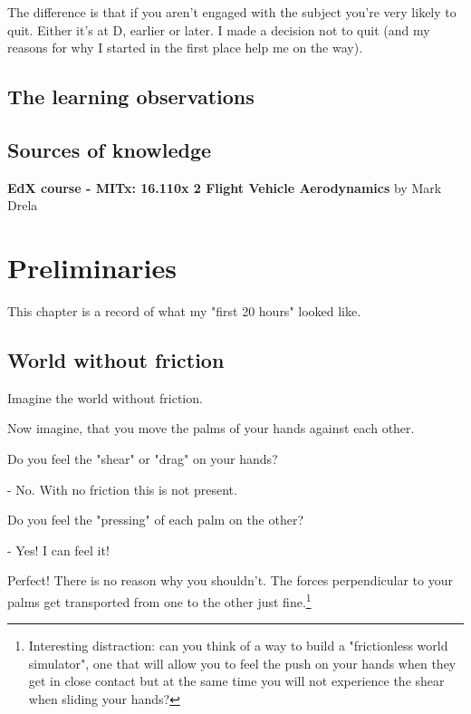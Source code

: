\documentclass[12pt]{report}
\begin{document}
The difference is that if you aren't engaged with the subject you're very likely to quit. Either it's at D, earlier or later. I made a decision not to quit (and my reasons for why I started in the first place help me on the way). 


\section{The learning observations} \label{chap:learning_observations}




\section{Sources of knowledge}


\textbf{EdX course - MITx: 16.110x 2 Flight Vehicle Aerodynamics} by Mark Drela










\chapter{Preliminaries}

This chapter is a record of what my "first 20 hours" looked like.


\section{World without friction} \label{chap:without_friction}

Imagine the world without friction.

Now imagine, that you move the palms of your hands against each other.

Do you feel the "shear" or "drag" on your hands?

- No. With no friction this is not present.

Do you feel the "pressing" of each palm on the other?

- Yes! I can feel it!

Perfect! There is no reason why you shouldn't. The forces perpendicular to your palms get transported from one to the other just fine.\footnote{Interesting distraction: can you think of a way to build a "frictionless world simulator", one that will allow you to feel the push on your hands when they get in close contact but at the same time you will not experience the shear when sliding your hands?}
\end{document}
